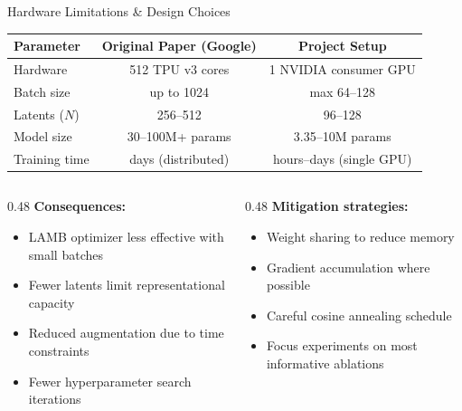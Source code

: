 \documentclass[aspectratio=169,11pt]{beamer}
\begin{document}
\begin{frame}[shrink=8]{Hardware Limitations \& Design Choices}
  \begin{table}
    \centering\small
    \begin{tabular}{lcc}
      \toprule
      \textbf{Parameter} & \textbf{Original Paper (Google)} & \textbf{Project Setup} \\
      \midrule
      Hardware & 512 TPU v3 cores & 1 NVIDIA consumer GPU \\
      Batch size & up to 1024 & max 64--128 \\
      Latents ($N$) & 256--512 & 96--128 \\
      Model size & 30--100M+ params & 3.35--10M params \\
      Training time & days (distributed) & hours--days (single GPU) \\
      \bottomrule
    \end{tabular}
  \end{table}

  \vspace{0.5em}
  \begin{columns}[T]
    \begin{column}{0.48\textwidth}
      \textbf{Consequences:}
      \begin{itemize}
        \item LAMB optimizer less effective with small batches
        \item Fewer latents limit representational capacity
        \item Reduced augmentation due to time constraints
        \item Fewer hyperparameter search iterations
      \end{itemize}
    \end{column}
    \begin{column}{0.48\textwidth}
      \textbf{Mitigation strategies:}
      \begin{itemize}
        \item Weight sharing to reduce memory
        \item Gradient accumulation where possible
        \item Careful cosine annealing schedule
        \item Focus experiments on most informative ablations
      \end{itemize}
    \end{column}
  \end{columns}
\end{frame}
\end{document}
